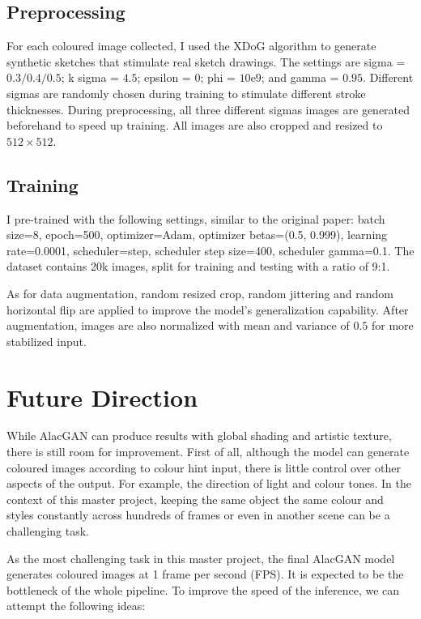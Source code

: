 \subsection{Preprocessing}
For each coloured image collected, I used the XDoG\cite{winnemollerXDoGEXtendedDifferenceofGaussians2012} algorithm to generate synthetic sketches that stimulate real sketch drawings. The settings are sigma = $0.3/0.4/0.5$; k sigma = $4.5$; epsilon = $0$; phi = $10\mathrm{e}9$; and gamma = $0.95$. Different sigmas are randomly chosen during training to stimulate different stroke thicknesses. During preprocessing, all three different sigmas images are generated beforehand to speed up training. All images are also cropped and resized to $512\times512$.

\subsection{Training}
I pre-trained with the following settings, similar to the original paper: batch size=8, epoch=500, optimizer=Adam, optimizer betas=(0.5, 0.999), learning rate=0.0001, scheduler=step, scheduler step size=400, scheduler gamma=0.1. The dataset contains 20k images, split for training and testing with a ratio of 9:1.

As for data augmentation, random resized crop, random jittering and random horizontal flip are applied to improve the model's generalization capability. After augmentation, images are also normalized with mean and variance of $0.5$ for more stabilized input.


\section{Future Direction}
While AlacGAN can produce results with global shading and artistic texture, there is still room for improvement. First of all, although the model can generate coloured images according to colour hint input, there is little control over other aspects of the output. For example, the direction of light and colour tones. In the context of this master project, keeping the same object the same colour and styles constantly across hundreds of frames or even in another scene can be a challenging task.

As the most challenging task in this master project, the final AlacGAN model generates coloured images at 1 frame per second (FPS). It is expected to be the bottleneck of the whole pipeline. To improve the speed of the inference, we can attempt the following ideas:

